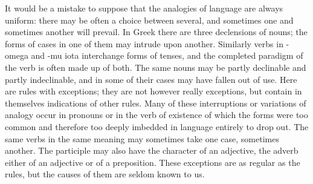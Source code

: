 \documentclass[11pt,letter]{article}
\begin{document}
\par  It would be a mistake to suppose that the analogies of language are always uniform: there may be often a choice between several, and sometimes one and sometimes another will prevail. In Greek there are three declensions of nouns; the forms of cases in one of them may intrude upon another. Similarly verbs in -omega and -mu iota interchange forms of tenses, and the completed paradigm of the verb is often made up of both. The same nouns may be partly declinable and partly indeclinable, and in some of their cases may have fallen out of use. Here are rules with exceptions; they are not however really exceptions, but contain in themselves indications of other rules. Many of these interruptions or variations of analogy occur in pronouns or in the verb of existence of which the forms were too common and therefore too deeply imbedded in language entirely to drop out. The same verbs in the same meaning may sometimes take one case, sometimes another. The participle may also have the character of an adjective, the adverb either of an adjective or of a preposition. These exceptions are as regular as the rules, but the causes of them are seldom known to us.
\end{document}
